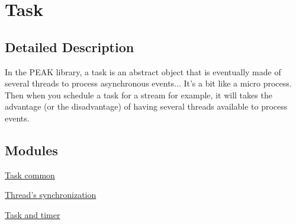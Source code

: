 \hypertarget{group__task}{
\section{Task}
\label{group__task}
}


\subsection{Detailed Description}
In the PEAK library, a task is an abstract object that is eventually made of several threads to process asynchronous events... It's a bit like a micro process. Then when you schedule a task for a stream for example, it will takes the advantage (or the disadvantage) of having several threads available to process events. 

\subsection*{Modules}
\begin{CompactItemize}
\item 
\hyperlink{group__task__common}{Task common}
\item 
\hyperlink{group__task__sync}{Thread's synchronization}
\item 
\hyperlink{group__task__timer}{Task and timer}
\end{CompactItemize}
